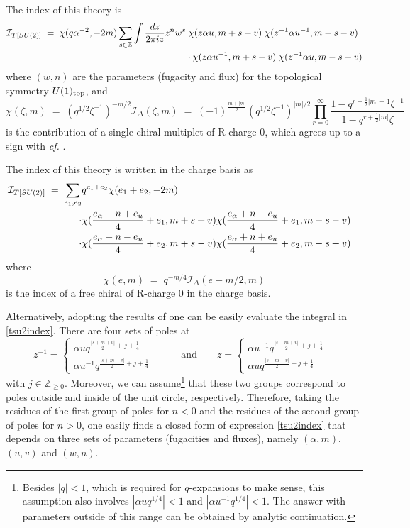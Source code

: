 \documentclass[11pt,letterpaper]{article}
\numberwithin{equation}{section}
\newcommand{\be}{\begin{equation}}
\newcommand{\ee}{\end{equation}}
\newcommand{\Z}{{\mathbb Z}}
\newcommand{\CI}{\mathcal{I}}
\newcommand{\q}{q}
\begin{document}
The index of this theory is
\begin{align}
\CI_{T[SU(2)]} \; = \; \chi(q \alpha^{-2}, -2m)
\sum_{s \in \Z} \int \frac{dz}{ 2 \pi i z} z^{n} w^{s}
& \; \chi (z \alpha u, m + s + v)
\; \chi (z^{-1} \alpha u^{-1}, m-s - v) \notag \\
& \cdot \chi (z \alpha u^{-1}, m + s - v)
\; \chi (z^{-1} \alpha u, m - s + v)
\label{tsu2index}
\end{align}
where $(w,n)$ are the parameters (fugacity and flux) for the topological symmetry $U(1)_{\rm top}$, and
\be
\chi (\zeta, m) \; = \; (q^{1/2} \zeta^{-1})^{-m/2} \CI_\Delta(\zeta,m)  \; = \;  (-1)^{\frac{m + |m|}{2}} (q^{1/2} \zeta^{-1})^{|m|/2}  \prod_{r=0}^\infty \frac{1- \q^{r+\frac12|m|+1}\zeta^{-1}}{1-\q^{r+\frac12|m|}\zeta}\,
\label{chiralchi}
\ee
is the contribution of a single chiral multiplet of R-charge $0$, which agrees up to a sign with {\it cf.} \cite{KW-index}.

The index of this theory is written in the charge basis as
\begin{align}
\CI_{T[SU(2)]} \; = \; \sum_{e_1,e_2} & q^{e_1 + e_2} \chi(e_1 + e_2,-2 m) \cr \cdot & \chi(\frac{e_\alpha - n+ e_u}{4} + e_1,m+s+v) \chi(\frac{e_\alpha + n -e_u}{4} + e_1,m-s-v)\cr \cdot & \chi(\frac{e_\alpha -n -e_u}{4} +e_2,m+s-v)\chi(\frac{e_\alpha + n+ e_u}{4} + e_2,m-s+v)
\label{tsu2indexem}
\end{align}
where
\be
\chi (e, m) \; = \; q^{-m/4} \CI_\Delta(e-m/2,m) \ee
is the index of a free chiral of R-charge $0$ in the charge basis.



Alternatively, adopting the results of \cite{KW-index} one can be easily evaluate the integral in \eqref{tsu2index}.
There are four sets of poles at
\be
z^{-1} =
\begin{cases}
\alpha u q^{\tfrac{|s + m + v|}{2} + j + \tfrac{1}{4}} & \\
\alpha u^{-1} q^{\tfrac{|s + m - v|}{2} + j + \tfrac{1}{4}} &
\end{cases}
\qquad \text{and} \qquad
z =
\begin{cases}
\alpha u^{-1} q^{\tfrac{|s - m + v|}{2} + j + \tfrac{1}{4}} & \\
\alpha u q^{\tfrac{|s - m - v|}{2} + j + \tfrac{1}{4}} &
\end{cases}
\ee
with $j \in \Z_{\ge 0}$.
Moreover, we can assume\footnote{Besides $|q|<1$, which is required for $q$-expansions to make sense,
this assumption also involves $|\alpha u q^{1/4}|<1$ and $|\alpha u^{-1} q^{1/4}|<1$.
The answer with parameters outside of this range can be obtained by analytic continuation.}
that these two groups correspond to poles outside and inside of the unit circle, respectively.
Therefore, taking the residues of the first group of poles for $n<0$ and the residues of the second
group of poles for $n>0$, one easily finds a closed form of expression \eqref{tsu2index}
that depends on three sets of parameters (fugacities and fluxes), namely $(\alpha,m)$, $(u,v)$ and $(w,n)$.
\end{document}

